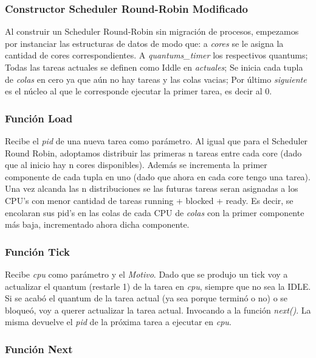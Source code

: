 \documentclass[a4paper]{article}
\begin{document}
\subsubsection*{Constructor Scheduler Round-Robin Modificado}		

Al construir un Scheduler Round-Robin sin migración de procesos, empezamos por instanciar las estructuras de datos de modo que: a \emph{cores} se le asigna la cantidad de cores correspondientes. A \emph{quantums\_timer} los respectivos quantums; Todas las tareas actuales se definen como Iddle en \emph{actuales}; Se inicia cada tupla de \emph{colas} en cero ya que aún no hay tareas y las colas vacias; Por último \emph{siguiente} es el n\'ucleo al que le corresponde ejecutar la primer tarea, es decir al 0.

\subsubsection*{Funci\'on Load}

Recibe el \emph{pid} de una nueva tarea como par\'ametro. Al igual que para el Scheduler Round Robin, adoptamos distribuir las primeras n tareas entre cada core (dado que al inicio hay n cores disponibles). Además se incrementa la primer componente de cada tupla en uno (dado que ahora en cada core tengo una tarea). Una vez alcanda las n distribuciones se las futuras tareas seran asignadas a los CPU's con menor cantidad de tareas running + blocked + ready.  Es decir, se encolaran sus pid's en las colas de cada CPU de \emph{colas} con la primer componente más baja, incrementado ahora dicha componente.

\subsubsection*{Funci\'on Tick}	

Recibe \emph{cpu} como par\'ametro y el \emph{Motivo}. Dado que se produjo un tick voy a actualizar el quantum (restarle 1) de la tarea en \emph{cpu}, siempre que no sea la IDLE. Si se acab\'o el quantum de la tarea actual (ya sea porque termin\'o o no) o se bloque\'o, voy a querer actualizar la tarea actual. Invocando a la funci\'on \emph{next()}. La misma devuelve el \emph{pid} de la próxima tarea a ejecutar en \emph{cpu}.

\subsubsection*{Funci\'on Next}	
	
\end{document}
